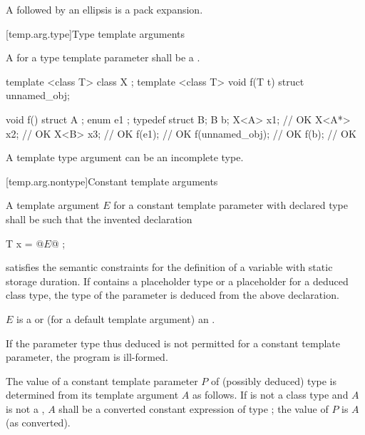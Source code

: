 \pnum
A  followed by an ellipsis is
a pack expansion.

[temp.arg.type]{Type template arguments}

\pnum
A
for a type template parameter
shall be a
.

\pnum
\begin{example}
\begin{codeblock}
template <class T> class X { };
template <class T> void f(T t) { }
struct { } unnamed_obj;

void f() {
  struct A { };
  enum { e1 };
  typedef struct { } B;
  B b;
  X<A> x1;          // OK
  X<A*> x2;         // OK
  X<B> x3;          // OK
  f(e1);            // OK
  f(unnamed_obj);   // OK
  f(b);             // OK
}
\end{codeblock}
\end{example}
\begin{note}
A template type argument can be an incomplete type.
\end{note}

[temp.arg.nontype]{Constant template arguments}

\pnum
A template argument $E$ for
a constant template parameter with declared type 
shall be such that the invented declaration
\begin{codeblock}
T x = @$E$@ ;
\end{codeblock}
satisfies the semantic constraints for the definition of
a  variable with static storage duration.
If  contains a placeholder type
or a placeholder for a deduced class type,
the type of the parameter is deduced from the above declaration.
\begin{note}
$E$ is a  or
(for a default template argument) an .
\end{note}
If the parameter type thus deduced is not permitted
for a constant template parameter,
the program is ill-formed.

\pnum
The value of a constant template parameter $P$
of (possibly deduced) type 
is determined from its template argument $A$ as follows.
If  is not a class type and
$A$ is not a ,
$A$ shall be a converted constant expression
of type ; the value of $P$ is $A$ (as converted).

